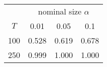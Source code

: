 % 
\begin{tabular}{cccc}
  \hline
  & \multicolumn{3}{c}{nominal size $\alpha$} \\
 $T$ & 0.01 & 0.05 & 0.1 \\
 \hline
100 & 0.528 & 0.619 & 0.678 \\ 
  250 & 0.999 & 1.000 & 1.000 \\ 
   \hline
\end{tabular}
